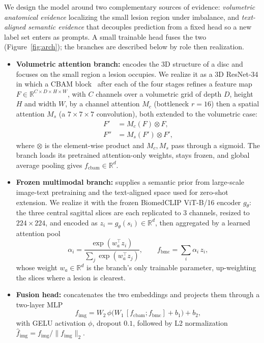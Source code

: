 \documentclass[runningheads]{llncs}
\begin{document}
We design the model around two complementary sources of evidence: \emph{volumetric anatomical evidence} localizing the small lesion region under imbalance, and \emph{text-aligned semantic evidence} that decouples prediction from a fixed head so a new label set enters as prompts. A small trainable head fuses the two (Figure~\ref{fig:arch}); the branches are described below by role then realization.
\begin{itemize}
\item \textbf{Volumetric attention branch:} encodes the 3D structure of a disc and focuses on the small region a lesion occupies. We realize it as a 3D ResNet-34 in which a CBAM block~\cite{woo2018cbam} after each of the four stages refines a feature map $F \in \mathbb{R}^{C \times D \times H \times W}$, with $C$ channels over a volumetric grid of depth $D$, height $H$ and width $W$, by a channel attention $M_c$ (bottleneck $r=16$) then a spatial attention $M_s$ (a $7\!\times\!7\!\times\!7$ convolution), both extended to the volumetric case:
\begin{align}
F' &= M_c(F) \otimes F, \label{eq:cbam_c}\\
F'' &= M_s(F') \otimes F', \label{eq:cbam_s}
\end{align}
where $\otimes$ is the element-wise product and $M_c, M_s$ pass through a sigmoid. The branch loads its pretrained attention-only weights, stays frozen, and global average pooling gives $f_{\text{cbam}} \in \mathbb{R}^{d}$.

\item \textbf{Frozen multimodal branch:} supplies a semantic prior from large-scale image-text pretraining and the text-aligned space used for zero-shot extension. We realize it with the frozen BiomedCLIP ViT-B/16 encoder $g_\theta$: the three central sagittal slices are each replicated to 3 channels, resized to $224\times224$, and encoded as $z_i = g_\theta(s_i) \in \mathbb{R}^{d}$, then aggregated by a learned attention pool
\begin{equation}
\alpha_i = \frac{\exp(w_a^\top z_i)}{\sum_{j} \exp(w_a^\top z_j)},
\qquad
f_{\text{bmc}} = \sum_{i} \alpha_i \, z_i,
\label{eq:slicepool}
\end{equation}
whose weight $w_a \in \mathbb{R}^{d}$ is the branch's only trainable parameter, up-weighting the slices where a lesion is clearest.

\item \textbf{Fusion head:} concatenates the two embeddings and projects them through a two-layer MLP
\begin{equation}
f_{\text{img}} = W_2\,\phi\!\big(W_1\,[f_{\text{cbam}};f_{\text{bmc}}] + b_1\big) + b_2,
\label{eq:fusion}
\end{equation}
with GELU activation $\phi$, dropout $0.1$, followed by L2 normalization $\hat{f}_{\text{img}} = f_{\text{img}} / \|f_{\text{img}}\|_2$.


\end{itemize}
\end{document}
